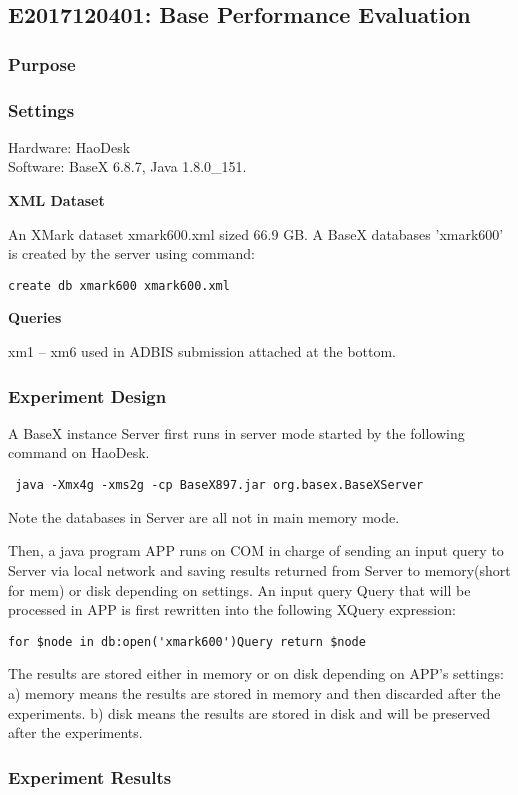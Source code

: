 \subsection{E2017120401: Base Performance Evaluation}
 
\subsubsection{Purpose}
 
\subsubsection{Settings} 
Hardware: HaoDesk\\
Software: BaseX 6.8.7, Java 1.8.0\_151.

\textbf{XML Dataset}

An XMark dataset xmark600.xml sized 66.9 GB. A BaseX databases 'xmark600' is
created by the server using command:

\verb|create db xmark600 xmark600.xml|

\textbf{Queries} 

xm1 -- xm6 used in ADBIS submission attached at the bottom.

\subsubsection{Experiment Design}  

A BaseX instance Server first runs in server mode started by the following
command on HaoDesk.

\verb| java -Xmx4g -xms2g -cp BaseX897.jar org.basex.BaseXServer|

Note the databases in Server are all not in main memory mode.

Then, a java program APP runs on COM in charge of sending an input query to
Server via local network and saving results returned from Server to memory(short
for mem) or disk depending on settings. An input query Query that will be
processed in APP is first rewritten into the following XQuery expression:

\verb|for $node in db:open('xmark600')Query return $node|

The results are stored either in memory or on disk depending on APP's settings:
a) memory means the results are stored in memory and then discarded after the
experiments. b) disk means the results are stored in disk and will be preserved
after the experiments.


\subsubsection{Experiment Results}

